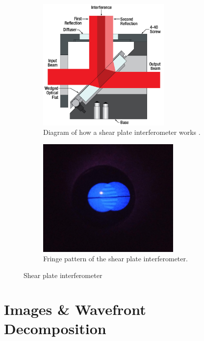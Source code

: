 \begin{figure}[H]
\centering
\begin{subfigure}{.5\textwidth}
  \centering
  \includegraphics[width=6.5cm]{Figures/ShearPlateDrawing.jpg}
  \caption{Diagram of how a shear plate interferometer works \cite{ShearingInterferometers}.}
  \label{fig:shearplate}
\end{subfigure}%
\begin{subfigure}{.5\textwidth}
  \centering
  \includegraphics[width=7cm]{Figures/fringes.jpg}
  \caption{Fringe pattern of the shear plate interferometer.}
  \label{fig:tilt_focal}
\end{subfigure}
\caption{Shear plate interferometer }
\label{fig:abb_images}
\end{figure}




\section{Images \& Wavefront Decomposition}